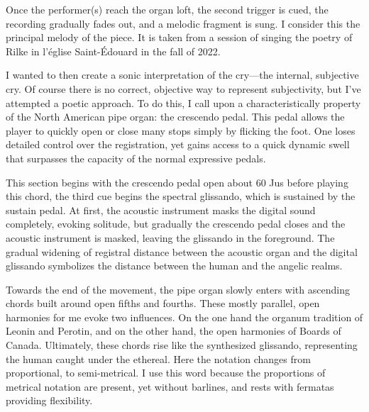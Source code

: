 \documentclass[12pt,twoside,maitrise]{dms_ks}
\theoremstyle{definition}
\begin{document}
Once the performer(s) reach the organ loft, the second trigger is cued, the recording gradually fades out, and a melodic fragment is sung.
I consider this the principal melody of the piece.
It is taken from a session of singing the poetry of Rilke in l'église Saint-Édouard in the fall of 2022.


I wanted to then create a sonic interpretation of the cry---the internal, subjective cry.
Of course there is no correct, objective way to represent subjectivity, but I've attempted a poetic approach.
To do this, I call upon a characteristically property of the North American pipe organ: the crescendo pedal.
This pedal allows the player to quickly open or close many stops simply by flicking the foot.
One loses detailed control over the registration, yet gains access to a quick dynamic swell that surpasses the capacity of the normal expressive pedals.

This section begins with the crescendo pedal open about 60%
Jus before playing this chord, the third cue begins the spectral glissando, which is sustained by the sustain pedal.
At first, the acoustic instrument masks the digital sound completely, evoking solitude, but gradually the crescendo pedal closes and the acoustic instrument is masked, leaving the glissando in the foreground.
The gradual widening of registral distance between the acoustic organ and the digital glissando symbolizes the distance between the human and the angelic realms.


Towards the end of the movement, the pipe organ slowly enters with ascending chords built around open fifths and fourths.
These mostly parallel, open harmonies for me evoke two influences.
On the one hand the organum tradition of Leonin and Perotin, and on the other hand, the open harmonies of Boards of Canada.
Ultimately, these chords rise like the synthesized glissando, representing the human caught under the ethereal.
Here the notation changes from proportional, to semi-metrical.
I use this word because the proportions of metrical notation are present, yet without barlines, and rests with fermatas providing flexibility.
\end{document}
